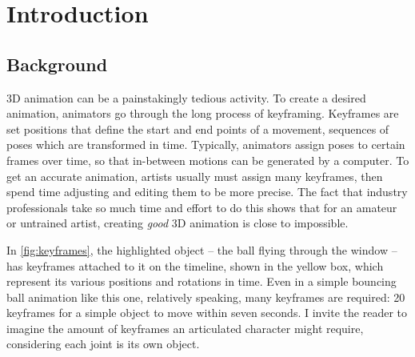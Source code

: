 \chapter{Introduction}\label{chap:intro}
\newcommand{\ignore}[1]{}
\ignore{Write this chapter LAST. Should be 5 to 10 pages. This chapter provides a quick summary of the
essential contents of the research project, principal results and contents of the report. The target
audience is members of the jury who do NOT have time to completely read all 21 reports, as well
academic members of other juries who wish to compare this work to other works.}

\section{Background}
\ignore{This is a generic title. Replace it with an actual title that describes the context of the work.
Short .5 page summary of the technological context of the work and why it is interesting or important}

3D animation can be a painstakingly tedious activity. To create a desired animation, animators go through the long process of keyframing. Keyframes are set positions that define the start and end points of a movement, sequences of poses which are transformed in time. Typically, animators assign poses to certain frames over time, so that in-between motions can be generated by a computer. To get an accurate animation, artists usually must assign many keyframes, then spend time adjusting and editing them to be more precise. The fact that industry professionals take so much time and effort to do this shows that for an amateur or untrained artist, creating \textit{good} 3D animation is close to impossible. 

In \autoref{fig:keyframes}, the highlighted object -- the ball flying through the window -- has keyframes attached to it on the timeline, shown in the yellow box, which represent its various positions and rotations in time. Even in a simple bouncing ball animation like this one, relatively speaking, many keyframes are required: 20 keyframes for a simple object to move within seven seconds. I invite the reader to imagine the amount of keyframes an articulated character might require, considering each joint is its own object.

